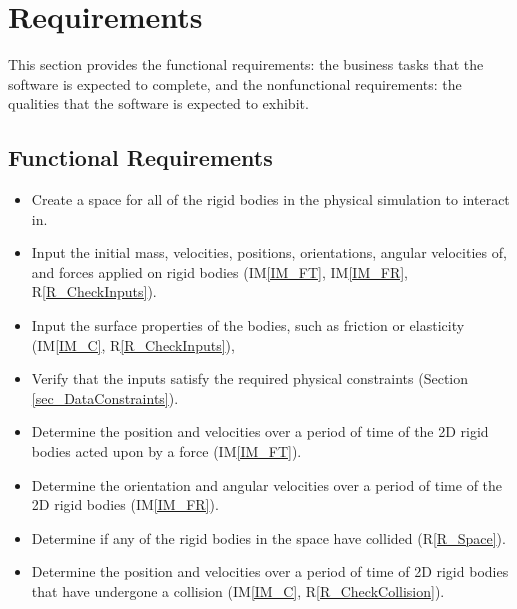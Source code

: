 \documentclass[12pt]{article}
\newcommand{\iref}[1]{IM\ref{#1}}
\newcounter{reqnum} %
\newcommand{\rref}[1]{R\ref{#1}}
\begin{document}
%
%

\section{Requirements}

This section provides the functional requirements: the business tasks that the
software is expected to complete, and the nonfunctional requirements: the
qualities that the software is expected to exhibit.

\subsection{Functional Requirements}

\noindent
\begin{itemize}

\item[R\refstepcounter{reqnum}\thereqnum \label{R_Space}:] Create a space for all of the rigid bodies in the physical simulation 
to interact in.  
\item[R\refstepcounter{reqnum}\thereqnum \label{R_Rigid}:] Input the initial mass, velocities, positions, orientations, angular velocities of, and forces applied on rigid bodies (\iref{IM_FT}, \iref{IM_FR}, \rref{R_CheckInputs}).
\item[R\refstepcounter{reqnum}\thereqnum \label{R_Shape}:] Input the surface properties of the bodies, such as friction or elasticity (\iref{IM_C}, \rref{R_CheckInputs}),
\item[R\refstepcounter{reqnum}\thereqnum \label{R_CheckInputs}:] Verify that the inputs satisfy the required physical constraints (Section \ref{sec_DataConstraints}).
\item[R\refstepcounter{reqnum}\thereqnum \label{R_Force}:] Determine the position and velocities over a period of time of the 2D
rigid bodies acted upon by a force (\iref{IM_FT}).
\item[R\refstepcounter{reqnum}\thereqnum \label{R_Rotation}:] Determine the orientation and angular velocities over a period of time of
the 2D rigid bodies (\iref{IM_FR}).
\item[R\refstepcounter{reqnum}\thereqnum \label{R_CheckCollision}:] Determine if any of the rigid bodies in the space have collided (\rref{R_Space}).
\item[R\refstepcounter{reqnum}\thereqnum \label{R_Collision}:] Determine the position and velocities over a period of time of 2D rigid
bodies that have undergone a collision (\iref{IM_C}, \rref{R_CheckCollision}).

\end{itemize} 
\end{document}
